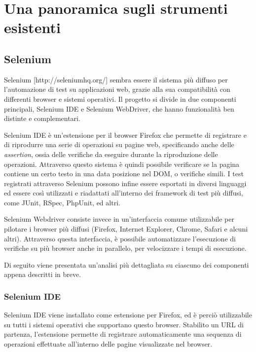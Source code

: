 \chapter{Una panoramica sugli strumenti esistenti}

\section{Selenium}

Selenium [http://seleniumhq.org/]  sembra essere il sistema più diffuso per l'automazione di test su applicazioni web, grazie alla sua compatibilità con differenti browser e sistemi operativi.
Il progetto si divide in due componenti principali, Selenium IDE e Selenium WebDriver, che hanno funzionalità ben distinte e complementari. 

Selenium IDE è un'estensione per il browser Firefox che permette di registrare e di riprodurre una serie di operazioni su pagine web, specificando anche delle \emph{assertion}, ossia delle verifiche da eseguire durante la riproduzione delle operazioni. Attraverso questo sistema è quindi possibile verificare se la pagina contiene un certo testo in una data posizione nel DOM, o verifiche simili. I test registrati attraverso Selenium possono infine essere esportati in diversi linguaggi ed essere così utilizzati e riadattati all'interno dei framework di test più diffusi, come JUnit, RSpec, PhpUnit, ed altri.

Selenium Webdriver consiste invece in un'interfaccia comune utilizzabile per pilotare i browser più diffusi (Firefox, Internet Explorer, Chrome, Safari e alcuni altri). Attraverso questa interfaccia, è possibile automatizzare l'esecuzione di verifiche su più browser anche in parallelo, per velocizzare i tempi di esecuzione.

Di seguito viene presentata un'analisi più dettagliata su ciascuno dei componenti appena descritti in breve.

\subsection{Selenium IDE}

Selenium IDE viene installato come estensione per Firefox,  ed è perciò utilizzabile su tutti i sistemi operativi che supportano questo browser. Stabilito un URL di partenza, l'estensione permette di registrare automaticamente una sequenza di operazioni effettuate all'interno delle pagine visualizzate nel browser. 

